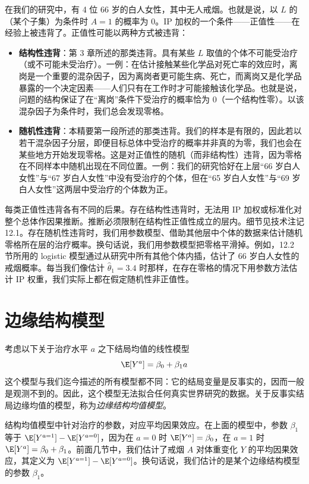 \renewcommand{\FPname}{精要（Fine Point）}
\begin{finepoint}[检查正值性]
在我们的研究中，有 4 位 66 岁的白人女性，其中无人戒烟。也就是说，以 $L$ 的（某个子集）为条件时 $A=1$ 的概率为 0。IP 加权的一个条件——正值性——在经验上被违背了。正值性可能以两种方式被违背：
\begin{itemize}
\item \textbf{结构性违背}：第 3 章所述的那类违背。具有某些 $L$ 取值的个体不可能受治疗（或不可能未受治疗）。一例：在估计接触某些化学品对死亡率的效应时，离岗是一个重要的混杂因子，因为离岗者更可能生病、死亡，而离岗又是化学品暴露的一个决定因素——人们只有在工作时才可能接触该化学品。也就是说，问题的结构保证了在“离岗”条件下受治疗的概率恰为 0（一个结构性零）。以该混杂因子为条件时，我们总会发现零格。
\item \textbf{随机性违背}：本精要第一段所述的那类违背。我们的样本是有限的，因此若以若干混杂因子分层，即便目标总体中受治疗的概率并非真的为零，我们也会在某些地方开始发现零格。这是对正值性的随机（而非结构性）违背，因为零格在不同样本中随机出现在不同位置。一例：我们的研究恰好在上层“66 岁白人女性”与“67 岁白人女性”中没有受治疗的个体，但在“65 岁白人女性”与“69 岁白人女性”这两层中受治疗的个体数为正。
\end{itemize}
每类正值性违背各有不同的后果。存在结构性违背时，无法用 IP 加权或标准化对整个总体作因果推断。推断必须限制在结构性正值性成立的层内。细节见技术注记 12.1。存在随机性违背时，我们用参数模型、借助其他层中个体的数据来估计随机零格所在层的治疗概率。换句话说，我们用参数模型把零格平滑掉。例如，12.2 节所用的 logistic 模型通过从研究中所有其他个体内插，估计了 66 岁白人女性的戒烟概率。每当我们像估计 $\hat\theta_1=3.4$ 时那样，在存在零格的情况下用参数方法估计 IP 权重，我们实际上都在假定随机性非正值性。
\end{finepoint}
\renewcommand{\FPname}{精要}

\section{边缘结构模型}

考虑以下关于治疗水平 $a$ 之下结局均值的线性模型
\[
\E[Y^{a}]=\beta_0+\beta_1a
\]
这个模型与我们迄今描述的所有模型都不同：它的结局变量是反事实的，因而一般是观测不到的。因此，这个模型无法拟合任何真实世界研究的数据。关于反事实结局边缘均值的模型，称为\emph{边缘结构均值模型}。

结构均值模型中针对治疗的参数，对应平均因果效应。在上面的模型中，参数 $\beta_1$ 等于 $\E[Y^{a=1}]-\E[Y^{a=0}]$，因为在 $a=0$ 时 $\E[Y^{a}]=\beta_0$，在 $a=1$ 时 $\E[Y^{a}]=\beta_0+\beta_1$。前面几节中，我们估计了戒烟 $A$ 对体重变化 $Y$ 的平均因果效应，其定义为 $\E[Y^{a=1}]-\E[Y^{a=0}]$。换句话说，我们估计的是某个边缘结构模型的参数 $\beta_1$。

